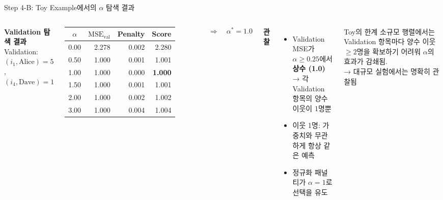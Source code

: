 \documentclass[aspectratio=169, 10pt]{beamer}
\begin{document}
\begin{frame}[shrink=5]{Step 4-B: Toy Example에서의 $\alpha$ 탐색 결과}

  \begin{columns}[T]
      \textbf{Validation 탐색 결과} \\
      {\small Validation: $(i_1,\text{Alice})=5$, $(i_4,\text{Dave})=1$}
      \vspace{0.3em}

      \renewcommand{\arraystretch}{1.2}
      \begin{tabular}{c|rrr}
        \toprule
        $\alpha$ & $\text{MSE}_\text{val}$ & Penalty & Score \\
        \midrule
        0.00 & 2.278 & 0.002 & 2.280 \\
        0.50 & 1.000 & 0.001 & 1.001 \\
        \rowcolor{hilight}
        1.00 & 1.000 & 0.000 & {\bf 1.000} \\
        1.50 & 1.000 & 0.001 & 1.001 \\
        2.00 & 1.000 & 0.002 & 1.002 \\
        3.00 & 1.000 & 0.004 & 1.004 \\
        \bottomrule
      \end{tabular}
      \vspace{0.3em}
      \[
        \Rightarrow \quad \alpha^* = 1.0
      \]

      \textbf{관찰}
      \begin{itemize}
        \item Validation MSE가 $\alpha \ge 0.25$에서 \textbf{상수 (1.0)}\\
              → 각 Validation 항목의 양수 이웃이 1명뿐
        \item 이웃 1명: 가중치와 무관하게 항상 같은 예측
        \item 정규화 패널티가 $\alpha = 1$로 선택을 유도
      \end{itemize}
      \vspace{0.4em}
      \begin{alertblock}{Toy의 한계}
        소규모 행렬에서는 Validation 항목마다
        양수 이웃 $\ge 2$명을 확보하기 어려워
        $\alpha$의 효과가 감쇄됨.\\
        → 대규모 실험에서는 명확히 관찰됨
      \end{alertblock}
  \end{columns}
\end{frame}
\end{document}
